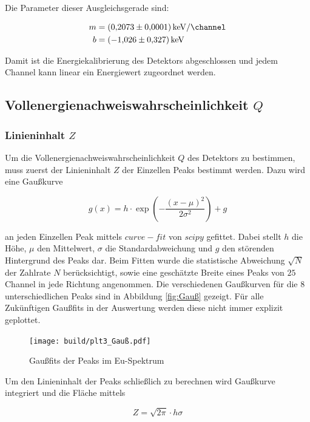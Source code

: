 Die Parameter dieser Ausgleichsgerade sind:

\begin{align*}
	m&=\qty[per-mode=fraction]{0.2073(0.0001)}{\kilo\eV\per\channel}\\
	b&=\qty{-1.026(0.327)}{\kilo\eV}
\end{align*}

Damit ist die Energiekalibrierung des Detektors abgeschlossen und jedem Channel kann linear ein Energiewert zugeordnet werden. 

\subsection{Vollenergienachweiswahrscheinlichkeit $Q$}
\subsubsection{Linieninhalt $Z$}
Um die Vollenergienachweiswahrscheinlichkeit $Q$ des Detektors zu bestimmen, muss zuerst der Linieninhalt $Z$ der Einzellen Peaks bestimmt werden. 
Dazu wird eine Gaußkurve 

\begin{equation}
	g(x)=h\cdot \exp(-\frac{(x-\mu )^2}{2\sigma^2})+g
	\label{eq:Gauß}
\end{equation}

an jeden Einzellen Peak mittels $curve-fit$ von $scipy$ \cite{scipy} gefittet. 
Dabei stellt $h$ die Höhe, $\mu$ den Mittelwert, $\sigma$ die Standardabweichung und $g$ den störenden Hintergrund des Peaks dar. 
Beim Fitten wurde die statistische Abweichung $\sqrt{N}$ der Zahlrate $N$ berücksichtigt, 
sowie eine geschätzte Breite eines Peaks von $25$ Channel in jede Richtung angenommen. 
Die verschiedenen Gaußkurven für die 8 unterschiedlichen Peaks sind in Abbildung \eqref{fig:Gauß} gezeigt. 
Für alle Zukünftigen Gaußfits in der Auswertung werden diese nicht immer explizit geplottet. 

\begin{figure}
    \centering
    \texttt{[image: build/plt3\_Gauß.pdf]}
	\caption{Gaußfits der Peaks im Eu-Spektrum}
	\label{fig:Gauß}
\end{figure}

Um den Linieninhalt der Peaks schließlich zu berechnen wird Gaußkurve integriert und die Fläche mittels 

\begin{equation}
	Z=\sqrt{2\pi}\cdot h\sigma
	\label{eq:Z}
\end{equation}

